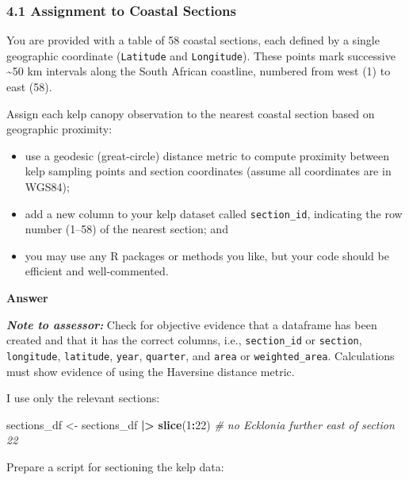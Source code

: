 \documentclass[
  british,
  10pt,
]{article}
\newenvironment{Shaded}{\begin{snugshade}}{\end{snugshade}}
\newcommand{\CommentTok}[1]{\textcolor[rgb]{0.56,0.35,0.01}{\textit{#1}}}
\newcommand{\DecValTok}[1]{\textcolor[rgb]{0.00,0.00,0.81}{#1}}
\newcommand{\FunctionTok}[1]{\textcolor[rgb]{0.13,0.29,0.53}{\textbf{#1}}}
\newcommand{\NormalTok}[1]{#1}
\newcommand{\OtherTok}[1]{\textcolor[rgb]{0.56,0.35,0.01}{#1}}
\newcommand{\SpecialCharTok}[1]{\textcolor[rgb]{0.81,0.36,0.00}{\textbf{#1}}}
\providecommand{\tightlist}{%
  \setlength{\itemsep}{0pt}\setlength{\parskip}{0pt}}
\let\oldtexttt\texttt
\renewcommand{\texttt}[1]{\oldtexttt{\small #1}}
\begin{document}
\subsubsection{4.1 Assignment to Coastal
Sections}\label{assignment-to-coastal-sections}

You are provided with a table of 58 coastal sections, each defined by a
single geographic coordinate (\texttt{Latitude} and \texttt{Longitude}).
These points mark successive \textasciitilde50 km intervals along the
South African coastline, numbered from west (1) to east (58).

Assign each kelp canopy observation to the nearest coastal section based
on geographic proximity:

\begin{itemize}
\tightlist
\item
  use a geodesic (great-circle) distance metric to compute proximity
  between kelp sampling points and section coordinates (assume all
  coordinates are in WGS84);
\item
  add a new column to your kelp dataset called \texttt{section\_id},
  indicating the row number (1--58) of the nearest section; and
\item
  you may use any R packages or methods you like, but your code should
  be efficient and well-commented.
\end{itemize}

\textbf{Answer}

\textbf{\emph{Note to assessor:}} Check for objective evidence that a
dataframe has been created and that it has the correct columns, i.e.,
\texttt{section\_id} or \texttt{section}, \texttt{longitude},
\texttt{latitude}, \texttt{year}, \texttt{quarter}, and \texttt{area} or
\texttt{weighted\_area}. Calculations must show evidence of using the
Haversine distance metric.

I use only the relevant sections:

\begin{Shaded}
\begin{Highlighting}[]
\NormalTok{sections\_df }\OtherTok{\textless{}{-}}\NormalTok{ sections\_df }\SpecialCharTok{|\textgreater{}}
  \FunctionTok{slice}\NormalTok{(}\DecValTok{1}\SpecialCharTok{:}\DecValTok{22}\NormalTok{) }\CommentTok{\# no Ecklonia further east of section 22}
\end{Highlighting}
\end{Shaded}

Prepare a script for sectioning the kelp data:
\end{document}

